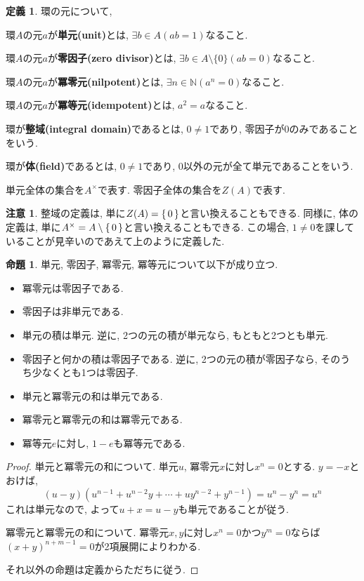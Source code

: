 \documentclass[a4paper, twoside]{bxjsarticle}
\newcommand{\nat}{\mathbb{N}}
\newcommand{\tb}{\textbf}
\theoremstyle{definition}
\newtheorem{prop}[thm]{命題}
\newtheorem{defn}[thm]{定義}
\newtheorem{rem}[thm]{注意}
\begin{document}
        \begin{defn}環の元について,

            環$A$の元$a$が\tb{単元(unit)}とは, $\exists b\in A(ab=1)$なること.
            
            環$A$の元$a$が\tb{零因子(zero divisor)}とは, $\exists b\in A\setminus\{0\}(ab=0)$なること. 

            環$A$の元$a$が\tb{冪零元(nilpotent)}とは, $\exists n\in \nat(a^n=0)$なること.

            環$A$の元$a$が\tb{冪等元(idempotent)}とは, $a^2 = a$なること.

            環が\tb{整域(integral domain)}であるとは, $0\neq 1$であり, 零因子が$0$のみであることをいう.

            環が\tb{体(field)}であるとは, $0\neq 1$であり, $0$以外の元が全て単元であることをいう.
            
            単元全体の集合を$A^\times$で表す. 零因子全体の集合を$Z(A)$で表す.
        \end{defn}
        \begin{rem}
            整域の定義は, 単に$Z(A)=\set{0}$と言い換えることもできる. 同様に, 体の定義は, 単に$A^\times = A\setminus\set{0}$と言い換えることもできる. この場合, $1\neq 0$を課していることが見辛いのであえて上のように定義した.
        \end{rem}
        \begin{prop}
            単元, 零因子, 冪零元, 冪等元について以下が成り立つ.
            \begin{itemize}
                \item 冪零元は零因子である.
                \item 零因子は非単元である.
                \item 単元の積は単元. 逆に, 2つの元の積が単元なら, もともと2つとも単元.
                \item 零因子と何かの積は零因子である. 逆に, 2つの元の積が零因子なら, そのうち少なくとも1つは零因子.
                \item 単元と冪零元の和は単元である.
                \item 冪零元と冪零元の和は冪零元である.
                \item 冪等元$e$に対し, $1-e$も冪等元である.
            \end{itemize}
        \end{prop}
        \begin{proof}
            単元と冪零元の和について. 単元$u$, 冪零元$x$に対し$x^n=0$とする. $y=-x$とおけば, 
            \[ (u-y)(u^{n-1}+u^{n-2}y+\cdots+uy^{n-2}+y^{n-1})=u^n-y^n = u^n\]
            これは単元なので, よって$u+x=u-y$も単元であることが従う.

            冪零元と冪零元の和について. 冪零元$x, y$に対し$x^n=0$かつ$y^m=0$ならば$(x+y)^{n+m-1}=0$が2項展開によりわかる.

            それ以外の命題は定義からただちに従う.
        \end{proof}
\end{document}
